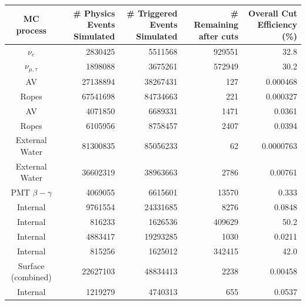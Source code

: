\begin{table}
    \begin{center}
        \begin{tabulary}{\textwidth}{c R R R R}
            \hline
            MC process       & \# Physics Events Simulated & \# Triggered Events Simulated  & \# Remaining after cuts & Overall Cut Efficiency (\%) \\ \hline \hline
            \beight{} $\nu_{e}$ & \num{2830425}  & \num{5511568}  & \num{929551} & 32.8     \\
            \beight{} $\nu_{\mu,\tau}$ & \num{1898088} & \num{3675261} & \num{572949} & 30.2\\
            \hline
            AV     & \num{27138894} & \num{38267431} & \num{127}    & 0.000468 \\
            Ropes  & \num{67541698} & \num{84734663} & \num{221}    & 0.000327 \\
            AV     & \num{4071850}  & \num{6689331}  & \num{1471}   & 0.0361    \\
            Ropes  & \num{6105956}  & \num{8758457}  & \num{2407}   & 0.0394   \\
            External Water  & \num{81300835} & \num{85056233} & \num{62} & 0.0000763 \\
            External Water  & \num{36602319} & \num{38963663} & \num{2786} & 0.00761 \\
            PMT $\beta-\gamma$  & \num{4069055}  & \num{6615601}  & \num{13570}  & 0.333    \\
            \hline
            Internal  & \num{9761554} & \num{24331685} & \num{8276} & 0.0848  \\
            Internal  & \num{816233} & \num{1626536} & \num{409629} & 50.2     \\
            Internal  & \num{4883417} & \num{19293285} & \num{1030} & 0.0211 \\
            Internal  & \num{815256} & \num{1625012} & \num{342415} & 42.0     \\ \hline
            Surface \alphan{} (combined) & \num{22627103} & \num{48834413} & \num{2238} & 0.00458 \\
            Internal \alphan{} & \num{1219279} & \num{4740313} & \num{655} & 0.0537 \\

\end{tabulary}
\end{center}
\end{table}
